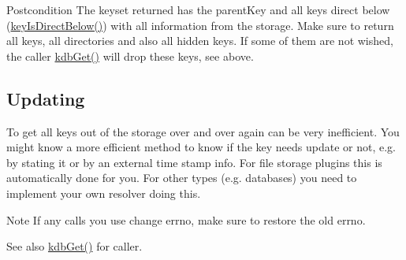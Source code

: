 \begin{DoxyPostcond}{Postcondition}
The keyset {\ttfamily returned} has the {\ttfamily parentKey} and all keys direct below (\hyperlink{group__keytest_ga4f175aafd98948ce6c774f3bd92b72ca}{keyIsDirectBelow()}) with all information from the storage. Make sure to return all keys, all directories and also all hidden keys. If some of them are not wished, the caller \hyperlink{group__kdb_ga28e385fd9cb7ccfe0b2f1ed2f62453a1}{kdbGet()} will drop these keys, see above.
\end{DoxyPostcond}
\hypertarget{group__plugin_updating}{}\subsection{Updating}\label{group__plugin_updating}
To get all keys out of the storage over and over again can be very inefficient. You might know a more efficient method to know if the key needs update or not, e.g. by stating it or by an external time stamp info. For file storage plugins this is automatically done for you. For other types (e.g. databases) you need to implement your own resolver doing this.

\begin{DoxyNote}{Note}
If any calls you use change errno, make sure to restore the old errno.
\end{DoxyNote}
\begin{DoxySeeAlso}{See also}
\hyperlink{group__kdb_ga28e385fd9cb7ccfe0b2f1ed2f62453a1}{kdbGet()} for caller.
\end{DoxySeeAlso}

